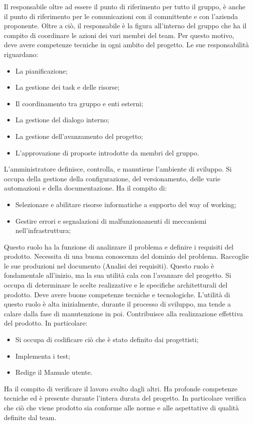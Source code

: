 \documentclass[10pt, a4paper]{article}
\begin{document}
Il responsabile oltre ad essere il punto di riferimento per tutto il gruppo, è anche il punto di riferimento per le comunicazioni con il committente e con l'azienda proponente. Oltre a ciò, il responsabile è la figura all'interno del gruppo che ha il compito di coordinare le azioni dei vari membri del team. Per questo motivo, deve avere competenze tecniche in ogni ambito del progetto.
Le sue responsabilità riguardano:
\begin{itemize}
    \item La pianificazione;
    \item La gestione dei task e delle risorse;
    \item Il coordinamento tra gruppo e enti esterni;
    \item La gestione del dialogo interno;
    \item La gestione dell'avanzamento del progetto;
    \item L'approvazione di proposte introdotte da membri del gruppo.
\end{itemize}
L'amministratore definisce, controlla, e manutiene l'ambiente di sviluppo. Si occupa della gestione della configurazione, del versionamento, delle varie automazioni e della documentazione.
Ha il compito di:
\begin{itemize}
    \item Selezionare e abilitare risorse informatiche a supporto del way of working;
    \item Gestire errori e segnalazioni di malfunzionamenti di meccanismi nell'infrastruttura;
\end{itemize}
Questo ruolo ha la funzione di analizzare il problema e definire i requisiti del prodotto. Necessita di una buona conoscenza del dominio del problema. Raccoglie le sue produzioni nel documento (Analisi dei requisiti).
Questo ruolo è fondamentale all'inizio, ma la sua utilità cala con l'avanzare del progetto. 
Si occupa di determinare le scelte realizzative e le specifiche architetturali del prodotto. Deve avere buone competenze tecniche e tecnologiche. L'utilità di questo ruolo è alta inizialmente, durante il processo di sviluppo, ma tende a calare dalla fase di manutenzione in poi.
Contribuisce alla realizzazione effettiva del prodotto.
In particolare:
\begin{itemize}
    \item Si occupa di codificare ciò che è stato definito dai progettisti;
    \item Implementa i test;
    \item Redige il Manuale utente.
\end{itemize}
Ha il compito di verificare il lavoro svolto dagli altri.
Ha profonde competenze tecniche ed è presente durante l'intera durata del progetto.
In particolare verifica che ciò che viene prodotto sia conforme alle norme e alle aspettative di qualità definite dal team.
\end{document}
